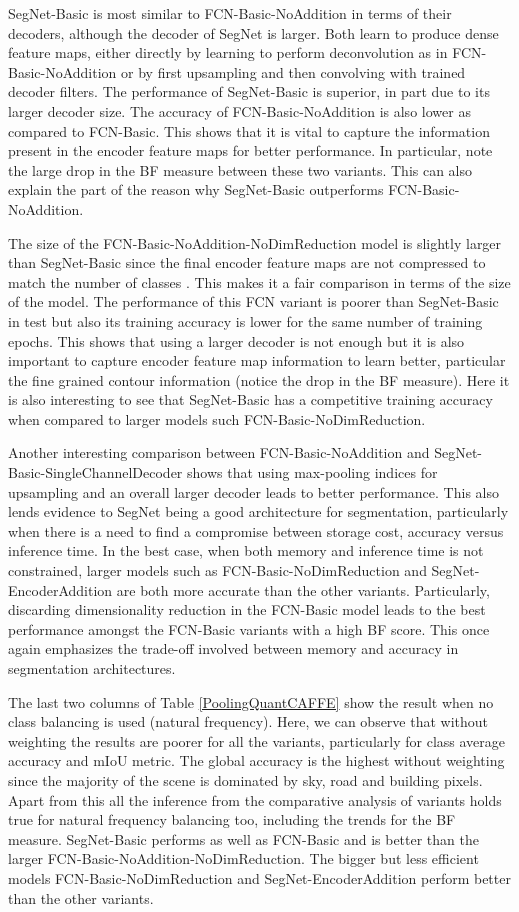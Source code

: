 \documentclass[10pt,journal,compsoc]{IEEEtran}
\begin{document}
SegNet-Basic is most similar to FCN-Basic-NoAddition in terms of their decoders, although the decoder of SegNet is larger. Both learn to produce dense feature maps, either directly by learning to perform deconvolution as in FCN-Basic-NoAddition or by first upsampling and then convolving with trained decoder filters. 
The performance of SegNet-Basic is superior, in part due to its larger decoder size. The accuracy of FCN-Basic-NoAddition is also lower as compared to FCN-Basic. This shows that it is vital to capture the information present in the encoder feature maps for better performance. In particular, note the large drop in the BF measure between these two variants. This can also explain the part of the reason why SegNet-Basic outperforms FCN-Basic-NoAddition. 

The size of the FCN-Basic-NoAddition-NoDimReduction model is slightly larger than SegNet-Basic since the final encoder feature maps are not compressed to match the number of classes . This makes it a fair comparison in terms of the size of the model. The performance of this FCN variant is poorer than SegNet-Basic in test but also its training accuracy is lower for the same number of training epochs. This shows that using a larger decoder is not enough but it is also important to capture encoder feature map information to learn better, particular the fine grained contour information (notice the drop in the BF measure). Here it is also interesting to see that SegNet-Basic has a competitive training accuracy when compared to larger models such FCN-Basic-NoDimReduction. 

Another interesting comparison between FCN-Basic-NoAddition and SegNet-Basic-SingleChannelDecoder shows that using max-pooling indices for upsampling and an overall larger decoder leads to better performance. This also lends evidence to SegNet being a good architecture for segmentation, particularly when there is a need to find a compromise between storage cost, accuracy versus inference time. In the best case, when both memory and inference time is not constrained, larger models such as FCN-Basic-NoDimReduction and SegNet-EncoderAddition are both more accurate than the other variants. Particularly, discarding dimensionality reduction in the FCN-Basic model leads to the best performance amongst the FCN-Basic variants with a high BF score. This once again emphasizes the trade-off involved between memory and accuracy in segmentation architectures.

The last two columns of Table \ref{PoolingQuantCAFFE} show the result when no class balancing is used (natural frequency). Here, we can observe that without weighting the results are poorer for all the variants, particularly for class average accuracy and mIoU metric. The global accuracy is the highest without weighting since the majority of the scene is dominated by sky, road and building pixels. Apart from this all the inference from the comparative analysis of variants holds true for natural frequency balancing too, including the trends for the BF measure. SegNet-Basic performs as well as FCN-Basic and is better than the larger FCN-Basic-NoAddition-NoDimReduction. The bigger but less efficient models FCN-Basic-NoDimReduction and SegNet-EncoderAddition perform better than the other variants.
\end{document}
